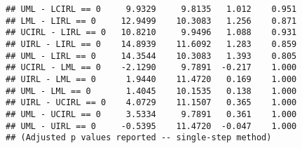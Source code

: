 \documentclass[letterpaper,12pt]{article}\usepackage[]{graphicx}\usepackage[]{color}
\makeatletter
\newenvironment{kframe}{%
 \def\at@end@of@kframe{}%
 \ifinner\ifhmode%
  \def\at@end@of@kframe{\end{minipage}}%
  \begin{minipage}{\columnwidth}%
 \fi\fi%
 \def\FrameCommand##1{\hskip\@totalleftmargin \hskip-\fboxsep
 \colorbox{shadecolor}{##1}\hskip-\fboxsep
     \hskip-\linewidth \hskip-\@totalleftmargin \hskip\columnwidth}%
 \MakeFramed {\advance\hsize-\width
   \@totalleftmargin\z@ \linewidth\hsize
   \@setminipage}}%
 {\par\unskip\endMakeFramed%
 \at@end@of@kframe}
\newenvironment{knitrout}{}{} %
\makeatother
\begin{document}
\begin{knitrout}
\begin{kframe}
\begin{verbatim}
## UML - LCIRL == 0     9.9329     9.8135   1.012    0.951
## LML - LIRL == 0     12.9499    10.3083   1.256    0.871
## UCIRL - LIRL == 0   10.8210     9.9496   1.088    0.931
## UIRL - LIRL == 0    14.8939    11.6092   1.283    0.859
## UML - LIRL == 0     14.3544    10.3083   1.393    0.805
## UCIRL - LML == 0    -2.1290     9.7891  -0.217    1.000
## UIRL - LML == 0      1.9440    11.4720   0.169    1.000
## UML - LML == 0       1.4045    10.1535   0.138    1.000
## UIRL - UCIRL == 0    4.0729    11.1507   0.365    1.000
## UML - UCIRL == 0     3.5334     9.7891   0.361    1.000
## UML - UIRL == 0     -0.5395    11.4720  -0.047    1.000
## (Adjusted p values reported -- single-step method)
\end{verbatim}
\end{kframe}
\end{knitrout}
\end{document}
